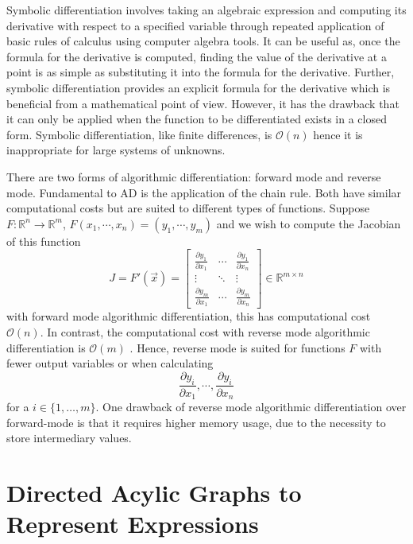 \documentclass{article}
\begin{document}
Symbolic differentiation involves taking an algebraic expression and computing its derivative with respect to a specified variable through repeated application of basic rules of calculus using computer algebra tools. It can be useful as, once the formula for the derivative is computed, finding the value of the derivative at a point is as simple as substituting it into the formula for the derivative.  Further, symbolic differentiation provides an explicit formula for the derivative which is beneficial from a mathematical point of view. However, it has the drawback that it can only be applied when the function to be differentiated exists in a closed form. Symbolic differentiation, like finite differences, is $\mathcal{O}(n)$ \cite{chem} hence it is inappropriate for large systems of unknowns.

There are two forms of algorithmic differentiation: forward mode and reverse mode. Fundamental to AD is the application of the chain rule. Both have similar computational costs but are suited to different types of functions. Suppose $F: \mathbb{R}^n \rightarrow \mathbb{R}^m$, $F(x_1, \cdots, x_n) = (y_1, \cdots, y_m)$ and we wish to compute the Jacobian of this function
\begin{equation*}
    J = F'(\Vec{x}) = \begin{bmatrix}
        \frac{\partial y_1}{\partial x_1} & \cdots & \frac{\partial y_1}{\partial x_n} \\
        \vdots & \ddots & \vdots \\
        \frac{\partial y_m}{\partial x_1} & \cdots & \frac{\partial y_m}{\partial x_n}
    \end{bmatrix} \in \mathbb{R}^{m \times n}
\end{equation*}
with forward mode algorithmic differentiation, this has computational cost $\mathcal{O}(n)$. In contrast, the computational cost with reverse mode algorithmic differentiation is $\mathcal{O}(m)$ \cite{falisse}. Hence, reverse mode is suited for functions $F$ with fewer output variables or when calculating 
\begin{equation*}
    \frac{\partial y_i}{\partial x_1}, \cdots, \frac{\partial y_i}{\partial x_n}
\end{equation*}
for a $i \in \{1, \dots, m \}$.
One drawback of reverse mode algorithmic differentiation over forward-mode is that it requires higher memory usage, due to the necessity to store intermediary values.

\section{Directed Acylic Graphs to Represent Expressions}
\end{document}
